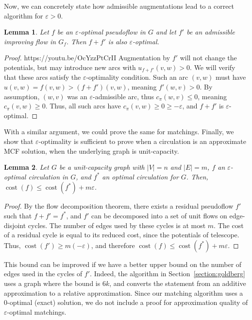 \documentclass[11pt]{article}
\def\eps{\varepsilon}
\theoremstyle{plain}
\newtheorem{lemma}{Lemma}
\def\cost{\operatorname{cost}}
\begin{document}
Now, we can concretely state how admissible augmentations lead to a correct
algorithm for $\eps > 0$.
\begin{lemma}
	Let $f$ be an $\eps$-optimal pseudoflow in $G$ and let $f'$ be an
	admissible improving flow in $G_f$.
	Then $f + f'$ is also $\eps$-optimal.
\end{lemma}
\begin{proof}https://youtu.be/OcYzzPtCrII
	Augmentation by $f'$ will not change the potentials, but may introduce
	new arcs with $u_{f+f'}(v, w) > 0$.
	We will verify that these arcs satisfy the $\eps$-optimality condition.
	Such an arc $(v, w)$ must have $u(v, w) = f(v, w) > (f+f')(v, w)$,
	meaning $f'(w, v) > 0$.
	By assumption, $(w, v)$ was an $\eps$-admissible arc, thus
	$c_\pi(w, v) \leq 0$, meaning $c_\pi(v, w) \geq 0$.
	Thus, all such arcs have $c_\pi(v, w) \geq 0 \geq -\eps$, and $f + f'$
	is $\eps$-optimal.
\end{proof}

With a similar argument, we could prove the same for matchings.
Finally, we show that $\eps$-optimality is sufficient to prove when a
circulation is an approximate MCF solution, when the underlying graph is
unit-capacity.

\begin{lemma}
\label{lemma:mcf_cost}
	Let $G$ be a unit-capacity graph with $|V| = n$ and $|E| = m$,
	$f$ an $\eps$-optimal circulation in $G$, and $f^*$ an optimal
	circulation for $G$.
	Then, $\cost(f) \leq \cost(f^*) + m\eps$.
\end{lemma}
\begin{proof}
	By the flow decomposition theorem, there exists a residual pseudoflow
	$f'$ such that $f + f' = f^*$, and $f'$ can be decomposed into a set of
	unit flows on edge-disjoint cycles.
	The number of edges used by these cycles is at most $m$.
	The cost of a residual cycle is equal to its reduced cost, since the
	potentials of telescope.
	Thus, $\cost(f') \geq m(-\eps)$, and therefore
	$\cost(f) \leq \cost(f^*) + m\eps$.
\end{proof}

This bound can be improved if we have a better upper bound on the number of
edges used in the cycles of $f'$.
Indeed, the algorithm in Section~\ref{section:goldberg} uses a graph where the
bound is $6k$, and converts the statement from an additive approximation to a
relative approximation.
Since our matching algorithm uses a 0-optimal (exact) solution, we do not
include a proof for approximation quality of $\eps$-optimal matchings.
\end{document}
